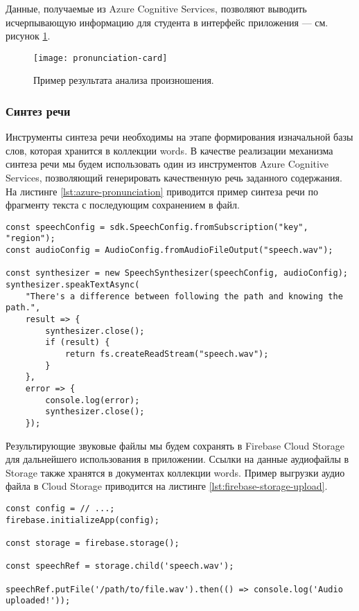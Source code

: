 Данные, получаемые из Azure Cognitive Services, позволяют выводить исчерпывающую информацию для студента в интерфейс приложения --- см. рисунок \ref{fig:pronunciation-card}.

\begin{figure}[h]
	\centering
	\texttt{[image: pronunciation-card]}
	\caption{Пример результата анализа произношения.}
	\label{fig:pronunciation-card}
\end{figure}

\subsubsection{Синтез речи}
Инструменты синтеза речи необходимы на этапе формирования изначальной базы слов, которая хранится в коллекции words. В качестве реализации механизма синтеза речи мы будем использовать один из инструментов Azure Cognitive Services, позволяющий генерировать качественную речь заданного содержания. На листинге \ref{lst:azure-pronunciation} приводится пример синтеза речи по фрагменту текста с последующим сохранением в файл.

\begin{lstlisting}[basicstyle=\fontsize{11}{11}\selectfont,tabsize=4,breaklines=true,caption={Пример проверки произношения с помощью Azure.},captionpos=b,label={lst:azure-pronunciation}]
const speechConfig = sdk.SpeechConfig.fromSubscription("key", "region");
const audioConfig = AudioConfig.fromAudioFileOutput("speech.wav");

const synthesizer = new SpeechSynthesizer(speechConfig, audioConfig);
synthesizer.speakTextAsync(
    "There's a difference between following the path and knowing the path.",
    result => {
        synthesizer.close();
        if (result) {
            return fs.createReadStream("speech.wav");
        }
    },
    error => {
        console.log(error);
        synthesizer.close();
    });
\end{lstlisting}

Результирующие звуковые файлы мы будем сохранять в Firebase Cloud Storage для дальнейшего использования в приложении. Ссылки на данные аудиофайлы в Storage также хранятся в документах коллекции words. Пример выгрузки аудио файла в Cloud Storage приводится на листинге \ref{lst:firebase-storage-upload}.

\begin{lstlisting}[basicstyle=\fontsize{11}{11}\selectfont,tabsize=4,breaklines=true,caption={Пример выгрузки аудио в Cloud Storage.},captionpos=b,label={lst:firebase-storage-upload}]
const config = // ...;
firebase.initializeApp(config);

const storage = firebase.storage();

const speechRef = storage.child('speech.wav');

speechRef.putFile('/path/to/file.wav').then(() => console.log('Audio uploaded!'));
\end{lstlisting}

